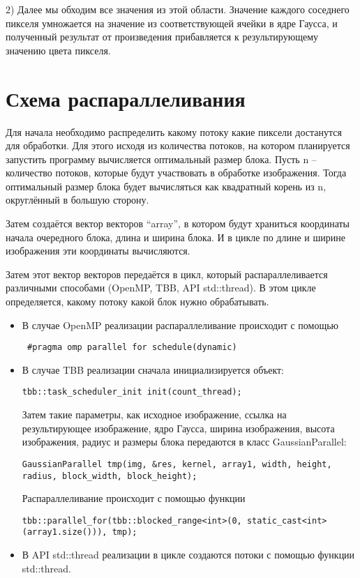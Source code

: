 \documentclass{report}
\begin{document}
    2) Далее мы обходим все значения из этой области. Значение каждого соседнего пикселя умножается на значение из соответствующей ячейки в ядре Гаусса, и полученный результат от произведения прибавляется к результирующему значению цвета пикселя.
\newpage

\section*{Схема распараллеливания}
Для начала необходимо распределить какому потоку какие пиксели достанутся для обработки. Для этого исходя из количества потоков, на котором планируется запустить программу вычисляется оптимальный размер блока. Пусть n – количество потоков, которые будут участвовать в обработке изображения. Тогда оптимальный размер блока будет вычисляться как квадратный корень из n, округлённый в большую сторону.
\par
Затем создаётся вектор векторов “array”, в котором будут храниться координаты начала очередного блока, длина и ширина блока. И в цикле по длине и ширине изображения эти координаты вычисляются.
\par
Затем этот вектор векторов передаётся в цикл, который распараллеливается различными способами (OpenMP, TBB, API std::thread). В этом цикле определяется, какому потоку какой блок нужно обрабатывать.
\begin{itemize}
\item В случае OpenMP реализации распараллеливание происходит с помощью 
 \begin{lstlisting}
 #pragma omp parallel for schedule(dynamic)
\end{lstlisting}
\item В случае TBB реализации сначала инициализируется объект:
\begin{lstlisting}
tbb::task_scheduler_init init(count_thread);
\end{lstlisting}
Затем такие параметры, как исходное изображение, ссылка на результирующее изображение, ядро Гаусса, ширина изображения, высота изображения, радиус и размеры блока передаются в класс GaussianParallel:
\begin{lstlisting}
GaussianParallel tmp(img, &res, kernel, array1, width, height, radius, block_width, block_height);
\end{lstlisting}
Распараллеливание происходит с помощью функции
\begin{lstlisting}
tbb::parallel_for(tbb::blocked_range<int>(0, static_cast<int>(array1.size())), tmp);
\end{lstlisting}
\item В API std::thread реализации в цикле создаются потоки с помощью функции std::thread.
\end{itemize}
\newpage
\end{document}
